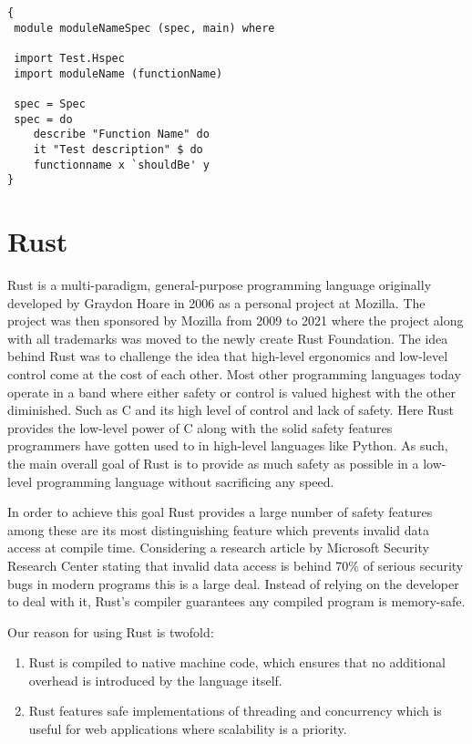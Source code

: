 \begin{lstlisting}[language=CSharp, caption={An example of a Hspec Test.}, label={lst:HspecTestExample}]
{
 module moduleNameSpec (spec, main) where

 import Test.Hspec
 import moduleName (functionName)
 
 spec = Spec
 spec = do
 	describe "Function Name" do
 	it "Test description" $ do
	functionname x `shouldBe' y
}
\end{lstlisting}

\section*{Rust}
Rust is a multi-paradigm, general-purpose programming language originally developed by Graydon Hoare in 2006 as a personal project at Mozilla. 
The project was then sponsored by Mozilla from 2009 to 2021 where the project along with all trademarks was moved to the newly create Rust Foundation. 
The idea behind Rust was to challenge the idea that high-level ergonomics and low-level control come at the cost of each other\cite{Rust_Book}.
Most other programming languages today operate in a band where either safety or control is valued highest with the other diminished. Such as C and its high level of control and lack of safety. 
Here Rust provides the low-level power of C along with the solid safety features programmers have gotten used to in high-level languages like Python. 
As such, the main overall goal of Rust is to provide as much safety as possible in a low-level programming language without sacrificing any speed\cite{Rust_in_Action}.

In order to achieve this goal Rust provides a large number of safety features among these are its most distinguishing feature which prevents invalid data access at compile time. 
Considering a research article by Microsoft Security Research Center stating that invalid data access is behind 70\% of serious security bugs in modern programs this is a large deal\cite{Safe_Systems_Languages}. 
Instead of relying on the developer to deal with it, Rust's compiler guarantees any compiled program is memory-safe.

Our reason for using Rust is twofold: 
\begin{enumerate}
    \item Rust is compiled to native machine code, which ensures that no additional overhead is introduced by the language itself.
    \item Rust features safe implementations of threading and concurrency which is useful for web applications where scalability is a priority.
\end{enumerate}

